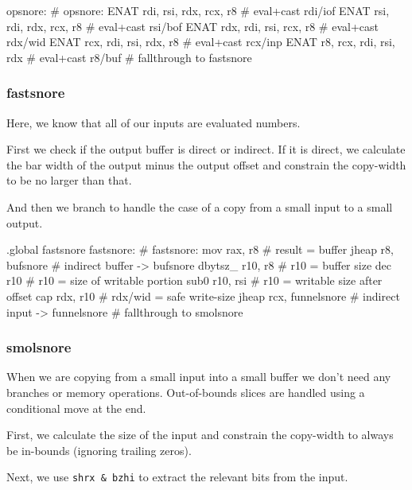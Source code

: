 \begin{asm}
opsnore:                                    # opsnore:
	ENAT	rdi, rsi, rdx, rcx, r8      #   eval+cast rdi/iof
	ENAT	rsi, rdi, rdx, rcx, r8      #   eval+cast rsi/bof
	ENAT	rdx, rdi, rsi, rcx, r8      #   eval+cast rdx/wid
	ENAT	rcx, rdi, rsi, rdx, r8      #   eval+cast rcx/inp
	ENAT	r8, rcx, rdi, rsi, rdx      #   eval+cast r8/buf
	# fallthrough to fastsnore
\end{asm}

\subsubsection{fastsnore}

Here, we know that all of our inputs are evaluated numbers.

First we check if the output buffer is direct or indirect.  If it is
direct, we calculate the bar width of the output minus the output offset
and constrain the copy-width to be no larger than that.

And then we branch to handle the case of a copy from a small input to
a small output.

\begin{asm}
.global fastsnore
fastsnore:                                  # fastsnore:
	mov	rax, r8                     #   result = buffer
	jheap	r8, bufsnore                #   indirect buffer -> bufsnore
	dbytsz_	r10, r8                     #   r10 = buffer size
	dec	r10                         #   r10 = size of writable portion
	sub0	r10, rsi                    #   r10 = writable size after offset
	cap	rdx, r10                    #   rdx/wid = safe write-size
	jheap	rcx, funnelsnore            #   indirect input -> funnelsnore
	# fallthrough to smolsnore
\end{asm}

\subsubsection{smolsnore}

When we are copying from a small input into a small buffer we don't need
any branches or memory operations.  Out-of-bounds slices are handled
using a conditional move at the end.

First, we calculate the size of the input and constrain the copy-width
to always be in-bounds (ignoring trailing zeros).

Next, we use \lstinline|shrx & bzhi| to extract the relevant bits from
the input.


